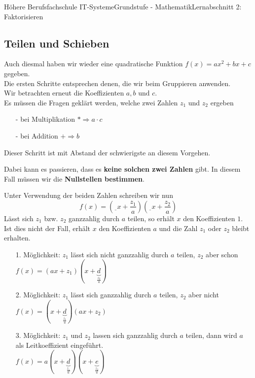 \documentclass[11pt,twocolumn,oneside,openany,headings=optiontotoc,11pt,numbers=noenddot]{article}
\begin{document}
\begin{worksheet}{Höhere Berufsfachschule IT-Systeme}{Grundstufe - Mathematik}{Lernabschnitt 2: Faktorisieren}
		\subsection{Teilen und Schieben}
		Auch diesmal haben wir wieder eine quadratische Funktion \(f(x) = ax^2 + bx + c\) gegeben.\\
		Die ersten Schritte entsprechen denen, die wir beim Gruppieren anwenden.\\
		Wir betrachten erneut die Koeffizienten \(a,b \text{ und } c\).\\
		Es müssen die Fragen geklärt werden, welche zwei Zahlen \(z_1\) und \(z_2\) ergeben
		\begin{itemize}
			\item[-] bei Multiplikation \(*\Rightarrow a\cdot{}c\)
			\item[-] bei Addition \(+\Rightarrow b\)
		\end{itemize}
		Dieser Schritt ist mit Abstand der schwierigste an diesem Vorgehen.
		\begin{framed}
			\noindent
			Dabei kann es passieren, dass es \textbf{keine solchen zwei Zahlen} gibt. In diesem Fall müssen wir die \textbf{Nullstellen bestimmen}.
			\color{red}
		\end{framed}
		\normalcolor
		\noindent
		Unter Verwendung der beiden Zahlen schreiben wir nun \[f(x) = (\underline{\ \ }x + \frac{z_1}{a})(\underline{\ \ }x + \frac{z_2}{a})\]
		Lässt sich \(z_1\) bzw. \(z_2\) ganzzahlig durch \(a\) teilen, so erhält \(x\) den Koeffizienten \(1\).\\
		Ist dies nicht der Fall, erhält \(x\) den Koeffizienten \(a\) und die Zahl \(z_1\) oder \(z_2\) bleibt erhalten.\\
		\par\noindent
		\begin{itemize}
			\item[] 1. Möglichkeit: \(z_1\) lässt sich nicht ganzzahlig durch \(a\) teilen, \(z_2\) aber schon\\
			\(f(x) = (ax + z_1)(x+\underbrace{d}_{\frac{z_2}{a}})\)
			\item[] 2. Möglichkeit: \(z_1\) lässt sich ganzzahlig durch \(a\) teilen, \(z_2\) aber nicht\\
			\(f(x) = (x + \underbrace{d}_{\frac{z_1}{a}})(ax+z_2)\)
			\item[] 3. Möglichkeit: \(z_1\) und \(z_2\) lassen sich ganzzahlig durch \(a\) teilen, dann wird \(a\) als Leitkoeffizient eingeführt.\\
			\(f(x) = a(x+\underbrace{d}_{\frac{z_1}{a}})(x+\underbrace{e}_{\frac{z_2}{a}})\)

\end{itemize}
\end{worksheet}
\end{document}
